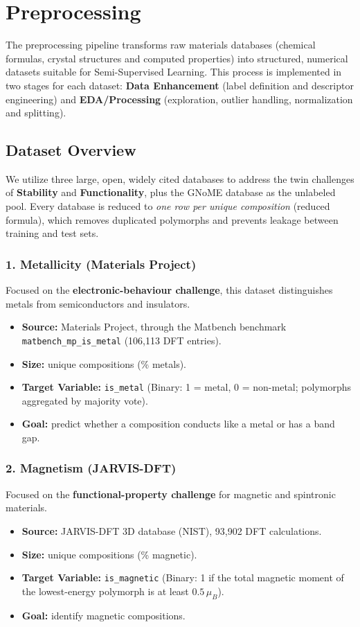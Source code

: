 \clearpage
\section{Preprocessing}

The preprocessing pipeline transforms raw materials databases (chemical formulas, crystal
structures and computed properties) into structured, numerical datasets suitable for
Semi-Supervised Learning. This process is implemented in two stages for each dataset:
\textbf{Data Enhancement} (label definition and descriptor engineering) and
\textbf{EDA/Processing} (exploration, outlier handling, normalization and splitting).

\subsection{Dataset Overview}

We utilize three large, open, widely cited databases to address the twin challenges of
\textbf{Stability} and \textbf{Functionality}, plus the GNoME database as the unlabeled pool.
Every database is reduced to \emph{one row per unique composition} (reduced formula), which
removes duplicated polymorphs and prevents leakage between training and test sets.

\subsubsection{1. Metallicity (Materials Project)}
Focused on the \textbf{electronic-behaviour challenge}, this dataset distinguishes metals from
semiconductors and insulators.
\begin{itemize}
  \item \textbf{Source:} Materials Project, through the Matbench benchmark
  \texttt{matbench\_mp\_is\_metal} (106,113 DFT entries).
  \item \textbf{Size:} \MetalN{} unique compositions (\MetalPos{}\% metals).
  \item \textbf{Target Variable:} \texttt{is\_metal} (Binary: 1 = metal, 0 = non-metal;
  polymorphs aggregated by majority vote).
  \item \textbf{Goal:} predict whether a composition conducts like a metal or has a band gap.
\end{itemize}

\subsubsection{2. Magnetism (JARVIS-DFT)}
Focused on the \textbf{functional-property challenge} for magnetic and spintronic materials.
\begin{itemize}
  \item \textbf{Source:} JARVIS-DFT 3D database (NIST), 93,902 DFT calculations.
  \item \textbf{Size:} \MagN{} unique compositions (\MagPos{}\% magnetic).
  \item \textbf{Target Variable:} \texttt{is\_magnetic} (Binary: 1 if the total magnetic moment
  of the lowest-energy polymorph is at least $0.5\,\mu_B$).
  \item \textbf{Goal:} identify magnetic compositions.
\end{itemize}

